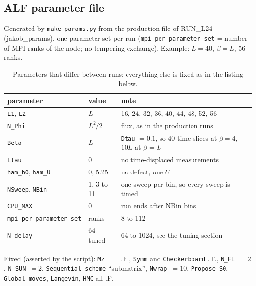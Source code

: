 \documentclass[11pt,a4paper]{article}
\begin{document}
\subsection*{ALF parameter file}
Generated by \texttt{make\_params.py} from the production file of RUN\_L24 (jakob\_params), one parameter set per run
(\texttt{mpi\_per\_parameter\_set} = number of MPI ranks of the node; no tempering exchange). Example: $L=40$, $\beta=L$, 56 ranks.
\begin{table}[H]\centering\small
\caption{Parameters that differ between runs; everything else is fixed as in the listing below.}
\begin{tabular}{@{}lll@{}}\toprule
parameter & value & note\\\midrule
\texttt{L1}, \texttt{L2} & $L$ & 16, 24, 32, 36, 40, 44, 48, 52, 56\\
\texttt{N\_Phi} & $L^2/2$ & flux, as in the production runs\\
\texttt{Beta} & $L$ & \texttt{Dtau} $=0.1$, so 40 time slices at $\beta=4$, $10L$ at $\beta=L$\\
\texttt{Ltau} & 0 & no time-displaced measurements\\
\texttt{ham\_h0}, \texttt{ham\_U} & 0, 5.25 & no defect, one $U$\\
\texttt{NSweep}, \texttt{NBin} & 1, 3 to 11 & one sweep per bin, so every sweep is timed\\
\texttt{CPU\_MAX} & 0 & run ends after NBin bins\\
\texttt{mpi\_per\_parameter\_set} & ranks & 8 to 112\\
\texttt{N\_delay} & 64, tuned & 64 to 1024, see the tuning section\\\bottomrule
\end{tabular}\end{table}
Fixed (asserted by the script): \texttt{Mz}~$=$~.F., \texttt{Symm} and \texttt{Checkerboard} .T., \texttt{N\_FL}~$=2$, \texttt{N\_SUN}~$=2$,
\texttt{Sequential\_scheme} ``submatrix'', \texttt{Nwrap}~$=10$, \texttt{Propose\_S0}, \texttt{Global\_moves}, \texttt{Langevin}, \texttt{HMC} all .F.
\small\normalsize
\end{document}
